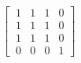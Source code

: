 \documentclass[preview]{standalone}
\begin{document}
\begin{center}
$\begin{bmatrix}\
                      1 & 1 & 1 & 0\\\
                      1 & 1 & 1 & 0\\\
                      1 & 1 & 1 & 0\\\
                      0 & 0 & 0 & 1\end{bmatrix}$
\end{center}
\end{document}
